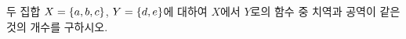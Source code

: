 두 집합 $X=\{a{,}\mkern3mu\mathopen{}b{,}\mkern3mu\mathopen{}c\}$, $Y=\{d{,}\mkern3mu\mathopen{}e\}$에 대하여 $X$에서 $Y$로의 함수 중 치역과 공역이 같은 것의 개수를 구하시오.
